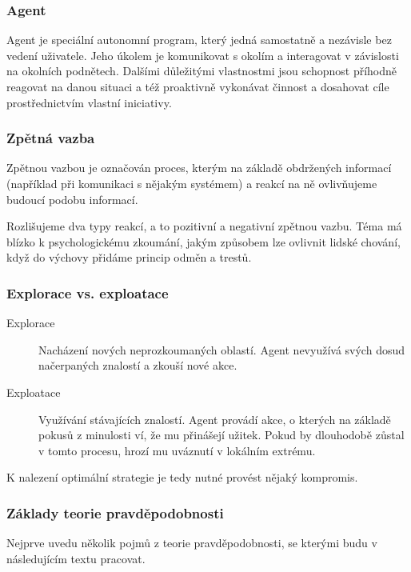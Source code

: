 \documentclass[thesis=M,czech]{FITthesis}[2014/05/07]
\begin{document}
\subsubsection{Agent}
\label{agent}
Agent je speciální autonomní program, který jedná samostatně a nezávisle bez vedení uživatele. Jeho úkolem je komunikovat s okolím a interagovat v závislosti na okolních podnětech. Dalšími důležitými vlastnostmi jsou schopnost příhodně reagovat na danou situaci a též proaktivně vykonávat činnost a dosahovat cíle prostřednictvím vlastní iniciativy.

\subsubsection{Zpětná vazba}
\label{feedback}
Zpětnou vazbou je označován proces, kterým na základě obdržených informací (například při komunikaci s nějakým systémem) a reakcí na ně ovlivňujeme budoucí podobu informací.

Rozlišujeme dva typy reakcí, a to pozitivní a negativní zpětnou vazbu. Téma má blízko k psychologickému zkoumání, jakým způsobem lze ovlivnit lidské chování, když do výchovy přidáme princip odměn a trestů.

\subsubsection{Explorace vs. exploatace}
\label{sub:explo}

\begin{description}
  \item[Explorace] Nacházení nových neprozkoumaných oblastí. Agent nevyužívá svých dosud načerpaných znalostí a zkouší nové akce. 
  \item[Exploatace] Využívání stávajících znalostí. Agent provádí akce, o kterých na základě pokusů z minulosti ví, že mu přinášejí užitek. Pokud by dlouhodobě zůstal v tomto procesu, hrozí mu uváznutí v lokálním extrému.
\end{description}	

K nalezení optimální strategie je tedy nutné provést nějaký kompromis.

\subsubsection{Základy teorie pravděpodobnosti}

Nejprve uvedu několik pojmů z teorie pravděpodobnosti, se kterými budu v následujícím textu pracovat.
\end{document}

